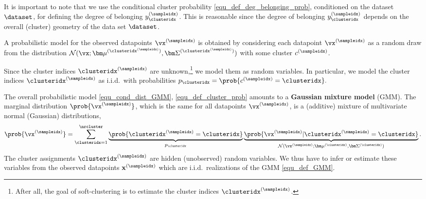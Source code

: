 \documentclass[12pt]{report}
\begin{document}
It is important to note that we use the conditional cluster 
probability \eqref{equ_def_deg_belonging_prob}, conditioned 
on the dataset $\dataset$, for defining the degree of belonging $y^{(\sampleidx)}_{\clusteridx}$. 
This is reasonable since the degree of belonging $y^{(\sampleidx)}_{\clusteridx}$ 
depends on the overall (cluster) geometry of the data set $\dataset$.

A probabilistic model for the observed datapoints $\vx^{(\sampleidx)}$ 
is obtained by considering each datapoint $\vx^{(\sampleidx)}$ as a 
random draw from the distribution $\mathcal{N} (\vx ; {\bm \mu}^{(\clusteridx^{(\sampleidx)})}, {\bm \Sigma}^{(\clusteridx^{(\sampleidx)})})$ with some cluster $c^{(\sampleidx)}$. 

Since the cluster indices $\clusteridx^{(\sampleidx)}$ are unknown,\footnote{After all, the goal 
of soft-clustering is to estimate the cluster indices $\clusteridx^{(\sampleidx)}$.} 
we model them as random variables. In particular, we model the cluster indices 
$\clusteridx^{(\sampleidx)}$ as i.i.d.\ with probabilities $p_{\clusteridx} = \prob{ c^{(\sampleidx)} = \clusteridx}.$ 

The overall probabilistic model \eqref{equ_cond_dist_GMM}, \eqref{equ_def_cluster_prob} 
amounts to a {\bf Gaussian mixture model} (GMM). The marginal distribution $\prob{\vx^{(\sampleidx)}}$, 
which is the same for all datapoints $\vx^{(\sampleidx)}$, is a (additive) mixture of 
multivariate normal (Gaussian) distributions, 
\begin{equation} 
\label{equ_def_GMM}
 \prob{\vx^{(\sampleidx)}} = \sum_{\clusteridx=1}^{\nrcluster} \underbrace{\prob{\clusteridx^{(\sampleidx)}=\clusteridx}}_{p_{\clusteridx}}  \underbrace{\prob{\vx^{(\sampleidx)} | \clusteridx^{(\sampleidx)}=\clusteridx}}_{\mathcal{N}(\vx^{(\sampleidx)};{\bm \mu}^{(\clusteridx)}, {\bm \Sigma}^{(\clusteridx)})}. 
\end{equation} 
The cluster assignments $\clusteridx^{(\sampleidx)}$ are hidden (unobserved) random 
variables. We thus have to infer or estimate these variables from the observed 
datapoints $\mathbf{x}^{(\sampleidx)}$ which are i.i.d.\ realizations of the GMM \eqref{equ_def_GMM}. 
\end{document}

